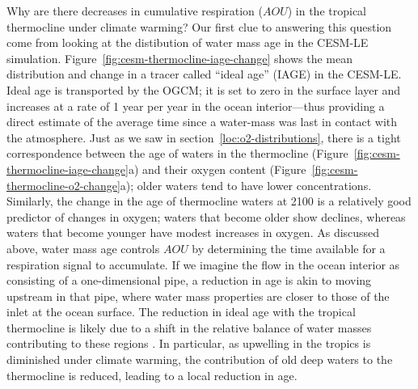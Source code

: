 \documentclass[draft,linenumbers]{report_chapter}
\begin{document}
Why are there decreases in cumulative respiration ($AOU$) in the tropical thermocline under climate warming?
Our first clue to answering this question come from looking at the distibution of water mass age in the CESM-LE simulation. Figure~\ref{fig:cesm-thermocline-iage-change} shows the mean distribution and change in a tracer called ``ideal age'' (IAGE) in the CESM-LE.
Ideal age is transported by the OGCM; it is set to zero in the surface layer and increases at a rate of 1 year per year in the ocean interior---thus providing a direct estimate of the average time since a water-mass was last in contact with the atmosphere.
Just as we saw in section~\ref{loc:o2-distributions}, there is a tight correspondence between the age of waters in the thermocline (Figure~\ref{fig:cesm-thermocline-iage-change}a) and their oxygen content (Figure~\ref{fig:cesm-thermocline-o2-change}a); older waters tend to have lower  concentrations.
Similarly, the change in the age of thermocline waters at 2100 is a relatively good predictor of changes in oxygen; waters that become older show  declines, whereas waters that become younger have modest increases in oxygen.
As discussed above, water mass age controls $AOU$ by determining the time available for a respiration signal to accumulate.
If we imagine the flow in the ocean interior as consisting of a one-dimensional pipe, a reduction in age is akin to moving upstream in that pipe, where water mass properties are closer to those of the inlet at the ocean surface.
The reduction in ideal age with the tropical thermocline is likely due to a shift in the relative balance of water masses contributing to these regions \citep{Gnanadesikan-Russell-etal-2007}.
In particular, as upwelling in the tropics is diminished under climate warming, the contribution of old deep waters to the thermocline is reduced, leading to a local reduction in age.
\end{document}
